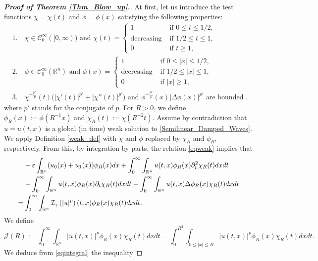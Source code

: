 \documentclass[11pt,reqno]{amsart}
\begin{document}
\begin{proof}[\textbf{Proof of Theorem \ref{Thm_Blow_up}.}]
At first, let us introduce the test functions $\chi= \chi(t)$ and $\phi=\phi(x)$ satisfying the following properties:
\begin{align*}
&1.\quad \chi \in \mathcal{C}_0^\infty([0,\infty)) \text{ and }
\chi(t)=
\begin{cases}
1 &\text{ if } 0 \leq t \leq 1/2, \\
\text{decreasing} &\text{ if } 1/2\leq t\leq 1, \\
0 &\text{ if } t \geq 1,
\end{cases} & \nonumber \\
&2.\quad \phi \in \mathcal{C}_0^\infty(\mathbb{R}^n) \text{ and }
\phi(x)=
\begin{cases}
1 &\text{ if }0 \leq |x| \leq 1/2, \\
\text{decreasing} &\text{ if } 1/2\leq |x| \leq 1, \\
0 &\text{ if } |x| \geq 1,
\end{cases} & \nonumber \\
&3.\quad \chi^{-\frac{p'}{p}}(t)\big(|\chi'(t)|^{p'}+|\chi''(t)|^{p'}\big) \text{ and } \phi^{-\frac{p'}{p}}(x)\left|\Delta \phi(x)\right|^{p'} \text{ are bounded }.
\end{align*}
where $p'$ stands for the conjugate of $p$. For $R>0$, we define $\phi_R(x):=\phi(R^{-1}x)$ and $\chi_R(t):=\chi(R^{-2}t)$. Assume by contradiction that $u=u(t,x)$ is a global (in time) weak solution to \eqref{Semilinear_Damped_Waves}.
 We apply Definition \ref{weak_def} with $\chi$ and $\phi$ replaced by $\chi_R$ and $\phi_R$, respectively.
From this, by integration by parts, the relation \eqref{eqweak} implies that
\begin{align}\label{eqintegral}
&-\varepsilon\int_{\mathbb{R}^n}(u_0(x)+u_1(x))\phi_R(x)dx+\int_0^{\infty}\int_{\mathbb{R}^n}u(t, x)\phi_R(x)\partial_t^2\chi_R(t) dxdt \notag\\
&-\int_0^{\infty}\int_{\mathbb{R}^n} u(t, x)\phi_R(x)\partial_t\chi_R(t)dxdt-\int_0^{\infty}\int_{\mathbb{R}^n}u(t, x)\Delta  \phi_R(x)\chi_R(t)dxdt \notag\\ =&\int_0^{\infty}\int_{\mathbb{R}^n}\mathcal{I}_{\gamma} \left(|u|^p\right)(t,x)\phi_R(x)\chi_{R}(t)dxdt.
\end{align}
We define
$$
\mathcal{J}(R):=\int_0^{\infty}\int_{\mathbb{R}^n}|u(t, x)|^p \phi_R(x)\chi_R(t)dxdt=\int_0^{R^2}\int_{0 \leq|x| \leq R}|u(t, x)|^p \phi_R(x)\chi_R(t)dxdt.
$$
We deduce from \eqref{eqintegral} the inequality

\end{proof}
\end{document}
